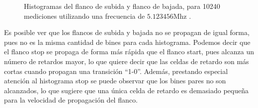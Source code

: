 \begin{figure}[H]
\begin{subfigure}{0.45\textwidth}
{           }
     \end{subfigure}
     \caption{Histogramas del flanco de subida y flanco de bajada, para 10240 mediciones
     utilizando una frecuencia de $5.123456$Mhz .}
     \label{fig: histogramas_magic}
\end{figure}%

Es posible ver que los flancos de subida y bajada no se propagan de igual forma, pues no es la misma cantidad de bines
para cada histograma. Podemos decir que el flanco stop se propaga de forma más
rápida que el flanco start, pues alcanza un número de retardos mayor, 
lo que quiere decir que las celdas de retardo son más cortas cuando propagan una transición ``1-0''.
Además, prestando especial atención al histograma stop se puede observar que los bines pares no son alcanzados,
lo que sugiere que una única celda de retardo es demasiado pequeña para la velocidad de propagación del flanco.\\


